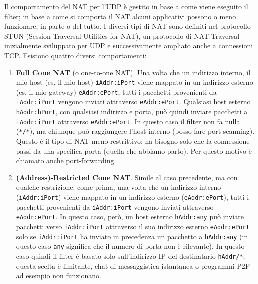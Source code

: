 \newpage
Il comportamento del NAT per l'UDP è gestito in base a come viene eseguito il filter; in base a come si comporta il NAT alcuni applicativi possono o meno funzionare, in parte o del tutto. I diversi tipi di NAT sono definiti nel protocollo STUN (Session Traversal Utilities for NAT), un protocollo di NAT Traversal inizialmente sviluppato per UDP e successivamente ampliato anche a connessioni TCP. Esistono quattro diversi comportamenti:
\begin{enumerate}
	\item \textbf{Full Cone NAT} (o one-to-one NAT). Una volta che un indirizzo interno, il mio host (es. il mio host) \texttt{iAddr:iPort} viene mappato in un indirizzo esterno (es. il mio gateway) \texttt{eAddr:ePort}, tutti i pacchetti provenienti da \texttt{iAddr:iPort} vengono inviati attraverso \texttt{eAddr:ePort}.  Qualsiasi host esterno \texttt{hAddr:hPort}, con qualsiasi indirizzo e porta, può quindi inviare pacchetti a \texttt{iAddr:iPort} attraverso \texttt{eAddr:ePort}.  In questo caso il filter non fa nulla (\texttt{*/*}), ma chiunque può raggiungere l'host interno (posso fare port scanning). Questo è il tipo di NAT meno restrittivo: ha bisogno solo che la connessione passi da una specifica porta (quella che abbiamo parto). Per questo motivo è chiamato anche port-forwarding. 
	
	\item \textbf{(Address)-Restricted Cone NAT}. Simile al caso precedente, ma con qualche restrizione: come prima, una volta che un indirizzo interno (\texttt{iAddr:iPort}) viene mappato in un indirizzo esterno (\texttt{eAddr:ePort}), tutti i pacchetti provenienti da \texttt{iAddr:iPort} vengono inviati attraverso \texttt{eAddr:ePort}. In questo caso, però, un host esterno \texttt{hAddr:any} può inviare pacchetti verso \texttt{iAddr:iPort} attraverso il suo indirizzo esterno \texttt{eAddr:ePort} solo se \texttt{iAddr:iPort} ha inviato in precedenza un pacchetto a \texttt{hAddr:any} (in questo caso \texttt{any} significa che il numero di porta non è rilevante). In questo caso quindi il filter è basato solo sull'indirizzo IP del destinatario \texttt{hAddr/*}; questa scelta è limitante, chat di messaggistica istantanea o programmi P2P ad esempio non funzionano. 
	

\end{enumerate}
